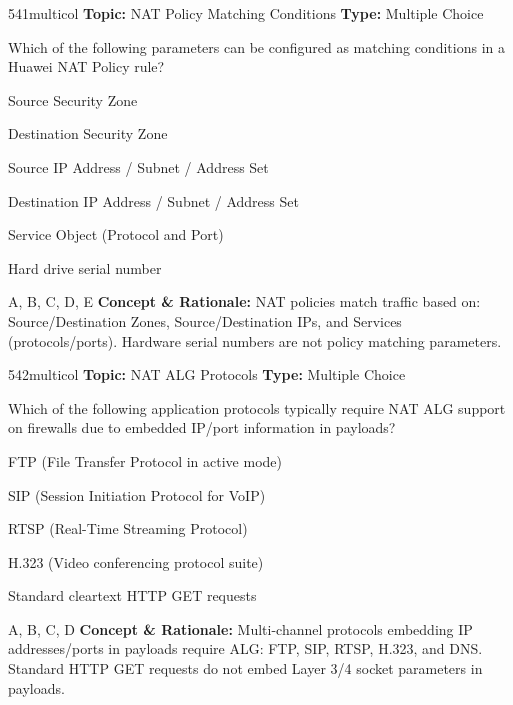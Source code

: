 \begin{qcard}{541}{multicol}
\textcolor{darkslate!75}{\small\textbf{Topic:} NAT Policy Matching Conditions \hfill \textbf{Type:} Multiple Choice}\vspace{0.4em}\par
Which of the following parameters can be configured as matching conditions in a Huawei NAT Policy rule?
\begin{qoptions}
\item Source Security Zone
\item Destination Security Zone
\item Source IP Address / Subnet / Address Set
\item Destination IP Address / Subnet / Address Set
\item Service Object (Protocol and Port)
\item Hard drive serial number
\end{qoptions}
\end{qcard}
\nopagebreak
\begin{explainbox}{A, B, C, D, E}
\textbf{Concept \& Rationale:} NAT policies match traffic based on: Source/Destination Zones, Source/Destination IPs, and Services (protocols/ports). Hardware serial numbers are not policy matching parameters.
\end{explainbox}

\begin{qcard}{542}{multicol}
\textcolor{darkslate!75}{\small\textbf{Topic:} NAT ALG Protocols \hfill \textbf{Type:} Multiple Choice}\vspace{0.4em}\par
Which of the following application protocols typically require NAT ALG support on firewalls due to embedded IP/port information in payloads?
\begin{qoptions}
\item FTP (File Transfer Protocol in active mode)
\item SIP (Session Initiation Protocol for VoIP)
\item RTSP (Real-Time Streaming Protocol)
\item H.323 (Video conferencing protocol suite)
\item Standard cleartext HTTP GET requests
\end{qoptions}
\end{qcard}
\nopagebreak
\begin{explainbox}{A, B, C, D}
\textbf{Concept \& Rationale:} Multi-channel protocols embedding IP addresses/ports in payloads require ALG: FTP, SIP, RTSP, H.323, and DNS. Standard HTTP GET requests do not embed Layer 3/4 socket parameters in payloads.
\end{explainbox}


